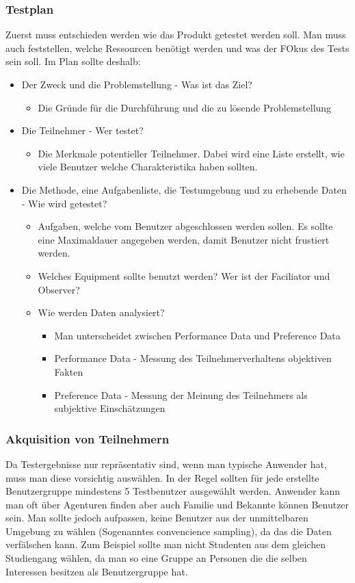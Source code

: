 \documentclass{article}
\begin{document}
	\subsubsection{Testplan}
	Zuerst muss entschieden werden wie das Produkt getestet werden soll. Man muss auch feststellen, welche Ressourcen benötigt werden und was der FOkus des Tests sein soll. Im Plan sollte deshalb:
	\begin{itemize}
		\item{Der Zweck und die Problemstellung - Was ist das Ziel?}
		\begin{itemize}
			\item{Die Gründe für die Durchführung und die zu lösende Problemstellung}
		\end{itemize}
		\item{Die Teilnehmer - Wer testet?}
		\begin{itemize}
			\item{Die Merkmale potentieller Teilnehmer. Dabei wird eine Liste erstellt, wie viele Benutzer welche Charakteristika haben sollten.}
		\end{itemize}
		\item{Die Methode, eine Aufgabenliste, die Testumgebung und zu erhebende Daten - Wie wird getestet?}
		\begin{itemize}
			\item{Aufgaben, welche vom Benutzer abgeschlossen werden sollen. Es sollte eine Maximaldauer angegeben werden, damit Benutzer nicht frustiert werden.}
			\item{Welches Equipment sollte benutzt werden? Wer ist der Faciliator und Observer?}
			\item{Wie werden Daten analysiert?}
			\begin{itemize}
				\item{Man unterscheidet zwischen Performance Data und Preference Data}
				\item{Performance Data - Messung des Teilnehmerverhaltens objektiven Fakten}
				\item{Preference Data - Messung der Meinung des Teilnehmers als subjektive Einschätzungen}
			\end{itemize}
		\end{itemize}
	\end{itemize}
	\subsubsection{Akquisition von Teilnehmern}
	Da Testergebnisse nur repräsentativ sind, wenn man typische Anwender hat, muss man diese vorsichtig auswählen. In der Regel sollten für jede erstellte Benutzergruppe mindestens 5 Testbenutzer ausgewählt werden. Anwender kann man oft über Agenturen finden aber auch Familie und Bekannte können Benutzer sein. Man sollte jedoch aufpassen, keine Benutzer aus der unmittelbaren Umgebung zu wählen (Sogenanntes convencience sampling), da das die Daten verfälschen kann. Zum Beispiel sollte man nicht Studenten aus dem gleichen Studiengang wählen, da man so eine Gruppe an Personen die die selben Interessen besitzen als Benutzergruppe hat.
\end{document}
